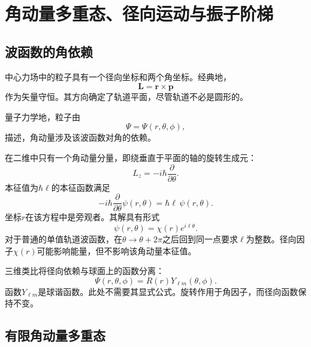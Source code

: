 \chapter{角动量多重态、径向运动与振子阶梯}

\section{波函数的角依赖}

中心力场中的粒子具有一个径向坐标和两个角坐标。经典地，
\begin{equation}
\mathbf L=\mathbf r\times\mathbf p
\end{equation}
作为矢量守恒。其方向确定了轨道平面，尽管轨道不必是圆形的。

量子力学地，粒子由
\begin{equation}
\Psi=\Psi(r,\theta,\phi),
\end{equation}
描述，角动量涉及该波函数对角的依赖。

在二维中只有一个角动量分量，即绕垂直于平面的轴的旋转生成元：
\begin{equation}
L_z=-i\hbar\frac{\partial}{\partial\theta}.
\end{equation}
本征值为\(\hbar\ell\)的本征函数满足
\begin{equation}
-i\hbar\frac{\partial}{\partial\theta}\psi(r,\theta)
=\hbar\ell\,\psi(r,\theta).
\end{equation}
坐标\(r\)在该方程中是旁观者。其解具有形式
\begin{equation}
\psi(r,\theta)=\chi(r)e^{i\ell\theta}.
\end{equation}
对于普通的单值轨道波函数，在\(\theta\to\theta+2\pi\)之后回到同一点要求\(\ell\)为整数。径向因子\(\chi(r)\)可能影响能量，但不影响该角动量本征值。

三维类比将径向依赖与球面上的函数分离：
\begin{equation}
\Psi(r,\theta,\phi)=R(r)Y_{\ell m}(\theta,\phi).
\end{equation}
函数\(Y_{\ell m}\)是球谐函数。此处不需要其显式公式。旋转作用于角因子，而径向函数保持不变。

\section{有限角动量多重态}

